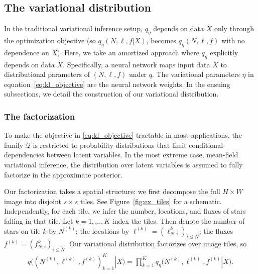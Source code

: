 \subsection{The variational distribution}
In the traditional variational inference setup, 
$q_\eta$ depends on data $X$ only through the optimization objective 
(so $q_\eta(N, \ell, f | X)$,
becomes $q_\eta(N, \ell, f)$ with no dependence on $X$). 
Here, we take an amortized approach where
$q_\eta$ explicitly depends on data $X$. Specifically, a neural network 
maps input data $X$ to distributional parameters of $(N, \ell, f)$ 
under $q$. The variational parameters $\eta$ in equation~\eqref{eq:kl_objective} 
are the neural network weights. 
In the ensuing subsections, we detail the construction of our variational distribution. 

\subsubsection{The factorization}
To make the objective in \eqref{eq:kl_objective} tractable in most 
applications, the family $\mathcal{Q}$ is restricted to probability distributions 
that limit conditional dependencies between latent variables. In the most extreme case, mean-field variational inference, 
the distribution over latent variables is assumed to fully factorize in the approximate posterior. 

Our factorization takes a spatial structure: we first decompose the full 
$H \times W$ image into disjoint $s \times s$ tiles. See Figure~\ref{fig:ex_tiles} for a schematic. 
Independently, for each tile, we infer the number, locations, and fluxes of stars falling in that tile.
Let $k = 1, ..., K$ index the tiles. Then
denote the number of stars on tile $k$ by $N^{(k)}$;
the locations by $\ell^{(k)} = (\ell_{N, i}^k)_{i \leq N}$; 
the fluxes $f^{(k)} = (f_{N, i}^k)_{i \leq N}$. Our variational 
distribution factorizes over image tiles, so
\begin{align}
    q\big((N^{(k)}, \ell^{(k)}, f^{(k)})_{k = 1}^K|X\big) = \prod_{k = 1}^K q_\eta\big(N^{(k)}, \ell^{(k)}, f^{(k)} | X\big). 
\end{align}

